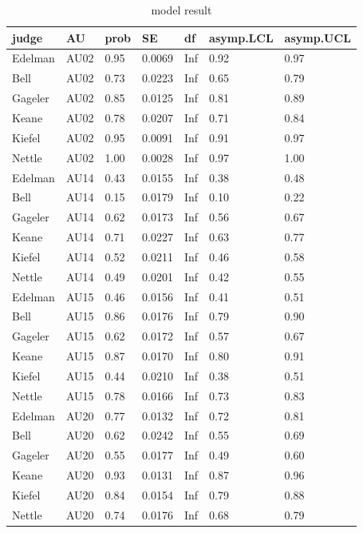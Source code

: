 \documentclass{monashthesis}
\begin{document}
\begin{table}[ht]
\begin{center}
\caption{\label{tab:result_1} model result}
\begin{tabular}{lllllll}
\toprule
judge & AU & prob & SE & df & asymp.LCL & asymp.UCL \\
\midrule
Edelman & AU02 & 0.95 & 0.0069 & Inf & 0.92 & 0.97 \\
Bell & AU02 & 0.73 & 0.0223 & Inf & 0.65 & 0.79 \\
Gageler & AU02 & 0.85 & 0.0125 & Inf & 0.81 & 0.89 \\
Keane & AU02 & 0.78 & 0.0207 & Inf & 0.71 & 0.84 \\
Kiefel & AU02 & 0.95 & 0.0091 & Inf & 0.91 & 0.97 \\
Nettle & AU02 & 1.00 & 0.0028 & Inf & 0.97 & 1.00 \\
Edelman & AU14 & 0.43 & 0.0155 & Inf & 0.38 & 0.48 \\
Bell & AU14 & 0.15 & 0.0179 & Inf & 0.10 & 0.22 \\
Gageler & AU14 & 0.62 & 0.0173 & Inf & 0.56 & 0.67 \\
Keane & AU14 & 0.71 & 0.0227 & Inf & 0.63 & 0.77 \\
Kiefel & AU14 & 0.52 & 0.0211 & Inf & 0.46 & 0.58 \\
Nettle & AU14 & 0.49 & 0.0201 & Inf & 0.42 & 0.55 \\
Edelman & AU15 & 0.46 & 0.0156 & Inf & 0.41 & 0.51 \\
Bell & AU15 & 0.86 & 0.0176 & Inf & 0.79 & 0.90 \\
Gageler & AU15 & 0.62 & 0.0172 & Inf & 0.57 & 0.67 \\
Keane & AU15 & 0.87 & 0.0170 & Inf & 0.80 & 0.91 \\
Kiefel & AU15 & 0.44 & 0.0210 & Inf & 0.38 & 0.51 \\
Nettle & AU15 & 0.78 & 0.0166 & Inf & 0.73 & 0.83 \\
Edelman & AU20 & 0.77 & 0.0132 & Inf & 0.72 & 0.81 \\
Bell & AU20 & 0.62 & 0.0242 & Inf & 0.55 & 0.69 \\
Gageler & AU20 & 0.55 & 0.0177 & Inf & 0.49 & 0.60 \\
Keane & AU20 & 0.93 & 0.0131 & Inf & 0.87 & 0.96 \\
Kiefel & AU20 & 0.84 & 0.0154 & Inf & 0.79 & 0.88 \\
Nettle & AU20 & 0.74 & 0.0176 & Inf & 0.68 & 0.79 \\
\bottomrule
\end{tabular}
\end{center}
\end{table}
\end{document}
